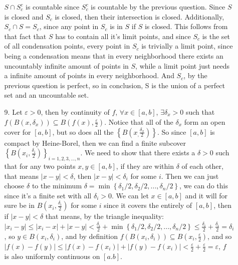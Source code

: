 \documentclass[12pt]{article}
\newcommand\set[1]{\left\lbrace #1 \right\rbrace}
\newcommand\abs[1]{\left| #1 \right|}
\begin{document}
\begin{itemize}
\begin{itemize}
         $S \cap S_c^c$ is countable since $S_c^c$ is countable by the previous question. Since $S$ is closed and $S_c$ is closed, then their intersection is closed. Additionally, $S_c \cap S = S_c$, since any point in $S_c$ is in $S$ if $S$ is closed. This follows from that fact that $S$ has to contain all it's limit points, and since $S_c$ is the set of all condensation points, every point in $S_c$ is trivially a limit point, since being a condensation means that in every neighborhood there exists an uncountably infinite amount of points in $S$, while a limit point just needs a infinite amount of points in every neighborhood. And $S_c$, by the previous question is perfect, so in conclusion, S is the union of a perfect set and an uncountable set. 
        	\item[9.]
        	Let $\varepsilon > 0 $, then by continuity of $f$, $\forall x \in [a,b]$, $\exists \delta_x > 0 $ such that $f(B(x,\delta_x)) \subseteq B(f(x), \frac{\varepsilon}{2})$. Notice that all of the $\delta_x$ form an open cover for $[a,b]$, but so does all the $\set{B(x_,\frac{\delta_x}{2})}$. So since $[a,b]$ is compact by Heine-Borel, then we can find a finite subcover $\set{B(x_i, \frac{\delta_i}{2})}_{i = 1,2,3,...,n}$. We need to show that there exists a $\delta > 0 $ such that for any two points $x,y \in [a,b]$, if they are within $\delta$ of each other, that means $|x-y| < \delta$, then $\abs{x-y} < \delta_i$ for some $i$. Then we can just choose $\delta$ to the minimum  $\delta = \min \set{\delta_1/2,\delta_2/2,...,\delta_n/2}$, we can do this since it's a finite set with all $\delta_i > 0$. We can let $x \in [a,b]$ and it will for sure be in $B(x_i, \frac{\delta_i}{2})$ for some $i$ since it covers the entirely of $[a,b]$, then if $\abs{x-y} < \delta$ that means, by the triangle inequality: $\abs{x_i-y} \leq \abs{x_i-x} + \abs{x-y} < \frac{\delta_i}{2} + \min \set{\delta_1/2,\delta_2/2,...,\delta_n/2} \leq \frac{\delta_i}{2}  + \frac{\delta_i}{2} = \delta_i $, so $y \in B(x_i, \delta_i)$, and by definition $f(B(x_i,\delta_i)) \subseteq B(x_i,\frac{\varepsilon}{2})$, and so $\abs{f(x)-f(y)} \leq \abs{f(x) - f(x_i)} + \abs{f(y) - f(x_i)} < \frac{\varepsilon}{2} + \frac{\varepsilon}{2} = \varepsilon$, $f$ is also uniformly continuous on $[a.b]$.
        \end{itemize}
    \end{itemize}
    
\end{document}
